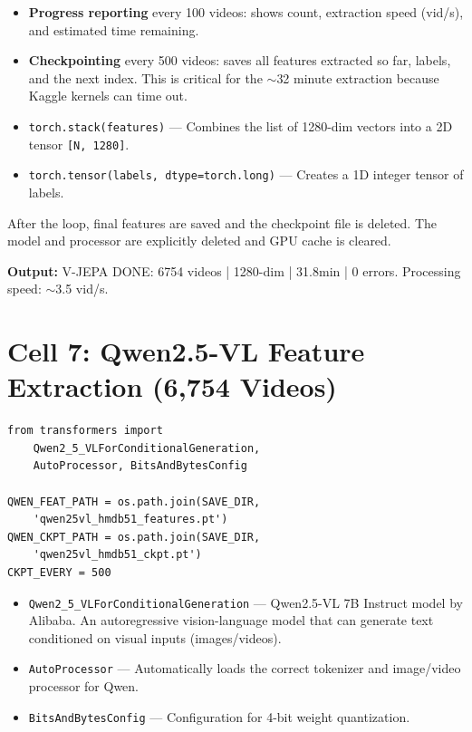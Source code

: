 \begin{explanation}
\begin{itemize}[nosep]
  \item \textbf{Progress reporting} every 100 videos: shows count, extraction speed (vid/s), and estimated time remaining.
  \item \textbf{Checkpointing} every 500 videos: saves all features extracted so far, labels, and the next index. This is critical for the $\sim$32 minute extraction because Kaggle kernels can time out.
  \item \texttt{torch.stack(features)} --- Combines the list of 1280-dim vectors into a 2D tensor \texttt{[N, 1280]}.
  \item \texttt{torch.tensor(labels, dtype=torch.long)} --- Creates a 1D integer tensor of labels.
\end{itemize}
\end{explanation}

After the loop, final features are saved and the checkpoint file is deleted. The model and processor are explicitly deleted and GPU cache is cleared.

\textbf{Output:} V-JEPA DONE: 6754 videos | 1280-dim | 31.8min | 0 errors. Processing speed: $\sim$3.5 vid/s.

\newpage
\section{Cell 7: Qwen2.5-VL Feature Extraction (6,754 Videos)}

\begin{lstlisting}
from transformers import
    Qwen2_5_VLForConditionalGeneration,
    AutoProcessor, BitsAndBytesConfig

QWEN_FEAT_PATH = os.path.join(SAVE_DIR,
    'qwen25vl_hmdb51_features.pt')
QWEN_CKPT_PATH = os.path.join(SAVE_DIR,
    'qwen25vl_hmdb51_ckpt.pt')
CKPT_EVERY = 500
\end{lstlisting}

\begin{explanation}
\begin{itemize}[nosep]
  \item \texttt{Qwen2\_5\_VLForConditionalGeneration} --- Qwen2.5-VL 7B Instruct model by Alibaba. An autoregressive vision-language model that can generate text conditioned on visual inputs (images/videos).
  \item \texttt{AutoProcessor} --- Automatically loads the correct tokenizer and image/video processor for Qwen.
  \item \texttt{BitsAndBytesConfig} --- Configuration for 4-bit weight quantization.
\end{itemize}
\end{explanation}

